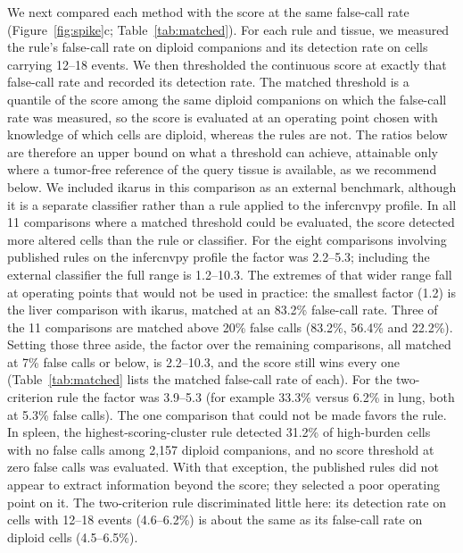 \documentclass[11pt,letterpaper]{article}
\begin{document}
We next compared each method with the score at the same false-call rate (Figure~\ref{fig:spike}c; Table~\ref{tab:matched}). For each rule and tissue, we measured the rule's false-call rate on diploid companions and its detection rate on cells carrying 12--18 events. We then thresholded the continuous score at exactly that false-call rate and recorded its detection rate. The matched threshold is a quantile of the score among the same diploid companions on which the false-call rate was measured, so the score is evaluated at an operating point chosen with knowledge of which cells are diploid, whereas the rules are not. The ratios below are therefore an upper bound on what a threshold can achieve, attainable only where a tumor-free reference of the query tissue is available, as we recommend below. We included ikarus in this comparison as an external benchmark, although it is a separate classifier rather than a rule applied to the infercnvpy profile. In all 11 comparisons where a matched threshold could be evaluated, the score detected more altered cells than the rule or classifier. For the eight comparisons involving published rules on the infercnvpy profile the factor was 2.2--5.3; including the external classifier the full range is 1.2--10.3. The extremes of that wider range fall at operating points that would not be used in practice: the smallest factor (1.2) is the liver comparison with ikarus, matched at an 83.2\% false-call rate. Three of the 11 comparisons are matched above 20\% false calls (83.2\%, 56.4\% and 22.2\%). Setting those three aside, the factor over the remaining comparisons, all matched at 7\% false calls or below, is 2.2--10.3, and the score still wins every one (Table~\ref{tab:matched} lists the matched false-call rate of each). For the two-criterion rule the factor was 3.9--5.3 (for example 33.3\% versus 6.2\% in lung, both at 5.3\% false calls). The one comparison that could not be made favors the rule. In spleen, the highest-scoring-cluster rule detected 31.2\% of high-burden cells with no false calls among 2{,}157 diploid companions, and no score threshold at zero false calls was evaluated. With that exception, the published rules did not appear to extract information beyond the score; they selected a poor operating point on it. The two-criterion rule discriminated little here: its detection rate on cells with 12--18 events (4.6--6.2\%) is about the same as its false-call rate on diploid cells (4.5--6.5\%).
\end{document}

